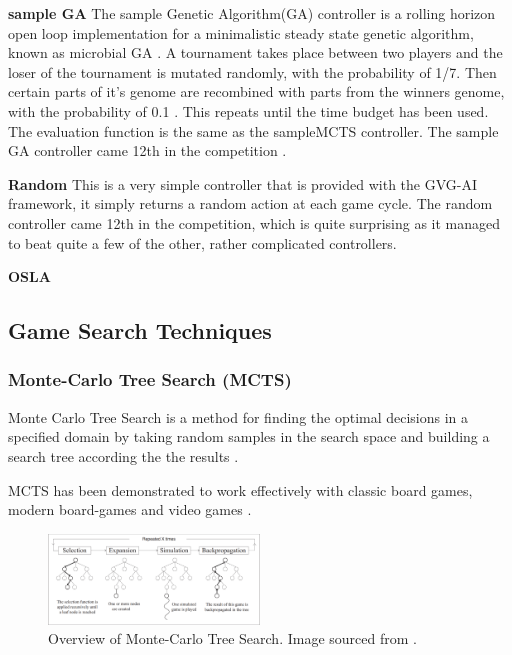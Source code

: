 \documentclass[journal]{IEEEtran}
\begin{document}
		\textbf{sample GA}
			The sample Genetic Algorithm(GA) controller is a rolling horizon open loop implementation for a minimalistic steady state genetic algorithm, known as microbial GA \cite{harvey2009microbial}.
			A tournament takes place between two players and the loser of the tournament is mutated randomly, with the probability of 1/7. Then certain parts of it's genome are recombined with parts from the winners genome, with the probability of 0.1 \cite{perez20162014}. 
			This repeats until the time budget has been used. The evaluation function is the same as the sampleMCTS controller.
			The sample GA controller came 12th in the competition \cite{perez20162014}.

		\textbf{Random}
			This is a very simple controller that is provided with the GVG-AI framework, it simply returns a random action at each game cycle.
			The random controller came 12th in the competition, which is quite surprising as it managed to beat quite a few of the other, rather complicated controllers.

		\textbf{OSLA}






		

		




	
		
	
	\subsection{Game Search Techniques}
		
		\subsubsection{Monte-Carlo Tree Search (MCTS) }\label{sssec:MCTS}

		Monte Carlo Tree Search is a method for finding the optimal decisions in a specified domain by taking random samples in the search space and building a search tree according the the results \cite{browne2012survey}. 
		
		MCTS has been demonstrated to work effectively with classic board games, modern board-games and video games \cite{chaslot2008monte}.

		\begin{figure}[h]
		    \centering
		    \includegraphics[width=0.5\textwidth]{MCTSProcess}
		    \caption{Overview of Monte-Carlo Tree Search. Image sourced from \cite{chaslot2008monte}. }
		    \label{fig:MCTS1}
		\end{figure}
		
\end{document}

